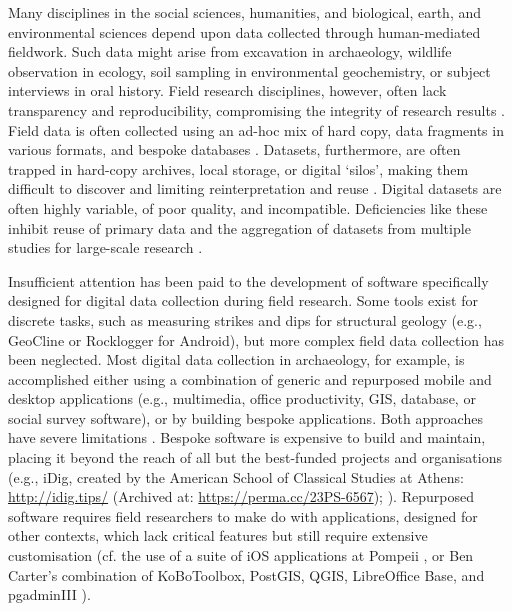 \documentclass[preprint,12pt, a4paper]{elsarticle}
\begin{document}
Many disciplines in the social sciences, humanities, and biological, earth, and environmental sciences depend upon data collected through human-mediated fieldwork. Such data might arise from excavation in archaeology, wildlife observation in ecology, soil sampling in environmental geochemistry, or subject interviews in oral history. Field research disciplines, however, often lack transparency and reproducibility, compromising the integrity of research results \cite{McNutt2016-dg}. Field data is often collected using an ad-hoc mix of hard copy, data fragments in various formats, and bespoke databases \cite{Borgman2015-zg, Kansa2010-qx, Kintigh2006-uf, Snow2006-nu}. Datasets, furthermore, are often trapped in hard-copy archives, local storage, or digital `silos', making them difficult to discover and limiting reinterpretation and reuse \cite{Blanke2010-ou}. Digital datasets are often highly variable, of poor quality, and incompatible. Deficiencies like these inhibit reuse of primary data and the aggregation of datasets from multiple studies for large-scale research \cite{Kintigh2006-uf, Kintigh2014-ks, McNutt2016-dg}. 

Insufficient attention has been paid to the development of software specifically designed for digital data collection during field research. Some tools exist for discrete tasks, such as measuring strikes and dips for structural geology (e.g., GeoCline or Rocklogger for Android), but more complex field data collection has been neglected. Most digital data collection in archaeology, for example, is accomplished either using a combination of generic and repurposed mobile and desktop applications (e.g., multimedia, office productivity, GIS, database, or social survey software), or by building bespoke applications. Both approaches have severe limitations \cite{Sobotkova2016-mx}. Bespoke software is expensive to build and maintain, placing it beyond the reach of all but the best-funded projects and organisations (e.g., iDig, created by the American School of Classical Studies at Athens: \url{http://idig.tips/} (Archived at: \url{https://perma.cc/23PS-6567}); \cite{Fee2016-nn}). Repurposed software requires field researchers to make do with applications, designed for other contexts, which lack critical features but still require extensive customisation (cf. the use of a suite of iOS applications at Pompeii \cite{Ellis2016-vh}, or Ben Carter's combination of KoBoToolbox, PostGIS, QGIS, LibreOffice Base, and pgadminIII \cite{Carter2016-jm}). 
\end{document}
